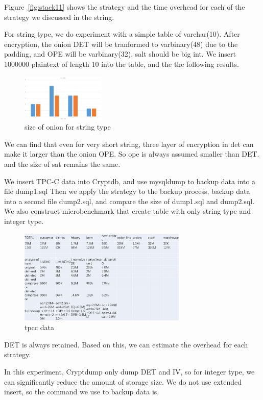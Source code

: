 Figure~\ref{fig:stack11} shows the strategy and the time overhead for each of the strategy we discussed in the string.


For string type, we do experiment with a simple table of varchar(10). After encryption, the onion DET will be tranformed to varbinary(48) due to the padding, and OPE will be varbinary(32), salt should be big int. We insert 1000000 plaintext of length 10 into the table, and the the following results. 


\begin{figure}[tb]
\centering
\includegraphics[width=4cm]{images/sizeofstr.png}
\caption{size of onion for string type}
\label{fig:stack12}
\end{figure}


We can find that even for very short string, three layer of encryption in det can make it larger than the onion OPE. So ope is always assumed  smaller than DET. and the size of sat remains the same.


We insert TPC-C data into Cryptdb, and use mysqldump to backup data into a file dump1.sql Then we apply the strategy to the backup process, backup data into a second file dump2.sql, and compare the size of dump1.sql and dump2.sql. We also construct microbenchmark that create table with only string type and integer type.



\begin{figure}[tb]
\centering
\includegraphics[width=8cm]{images/tpcc.png}
\caption{tpcc data}
\label{fig:stack13}
\end{figure}


DET is always retained. Based on this, we can estimate the overhead for each strategy. 



In this experiment, Cryptdump only dump DET and IV, so for integer type, we can significantly reduce the amount of storage size. We do not use extended insert, so the command we use to backup data is.


